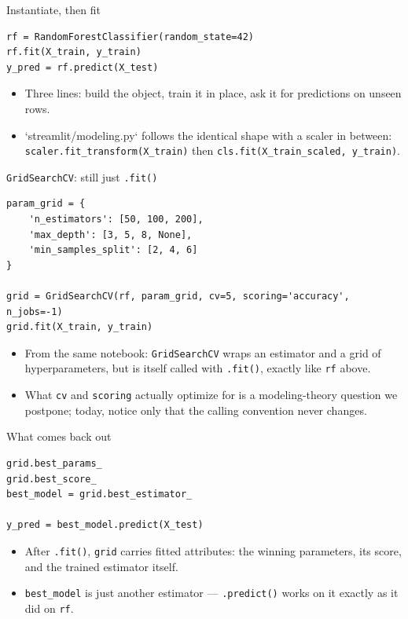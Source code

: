 \begin{frame}[fragile]{Instantiate, then fit}
\begin{lstlisting}[style=coursepython]
rf = RandomForestClassifier(random_state=42)
rf.fit(X_train, y_train)
y_pred = rf.predict(X_test)
\end{lstlisting}
\begin{itemize}
\item Three lines: build the object, train it in place, ask it for predictions on unseen rows.
\item `streamlit/modeling.py` follows the identical shape with a scaler in between: \texttt{scaler.fit\_transform(X\_train)} then \texttt{cls.fit(X\_train\_scaled, y\_train)}.
\end{itemize}
\coursefooter
\end{frame}

\begin{frame}[fragile]{\texttt{GridSearchCV}: still just \texttt{.fit()}}
\begin{lstlisting}[style=coursepython]
param_grid = {
    'n_estimators': [50, 100, 200],
    'max_depth': [3, 5, 8, None],
    'min_samples_split': [2, 4, 6]
}

grid = GridSearchCV(rf, param_grid, cv=5, scoring='accuracy', n_jobs=-1)
grid.fit(X_train, y_train)
\end{lstlisting}
\begin{itemize}
\item From the same notebook: \texttt{GridSearchCV} wraps an estimator and a grid of hyperparameters, but is itself called with \texttt{.fit()}, exactly like \texttt{rf} above.
\item What \texttt{cv} and \texttt{scoring} actually optimize for is a modeling-theory question we postpone; today, notice only that the calling convention never changes.
\end{itemize}
\coursefooter
\end{frame}

\begin{frame}[fragile]{What comes back out}
\begin{lstlisting}[style=coursepython]
grid.best_params_
grid.best_score_
best_model = grid.best_estimator_

y_pred = best_model.predict(X_test)
\end{lstlisting}
\begin{itemize}
\item After \texttt{.fit()}, \texttt{grid} carries fitted attributes: the winning parameters, its score, and the trained estimator itself.
\item \texttt{best\_model} is just another estimator --- \texttt{.predict()} works on it exactly as it did on \texttt{rf}.
\end{itemize}
\coursefooter
\end{frame}

